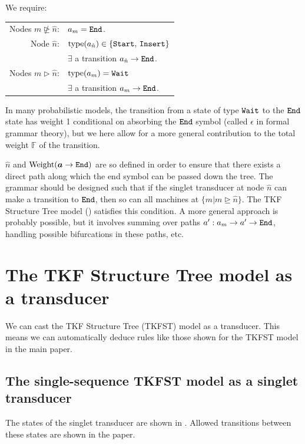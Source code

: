 \documentclass[10pt]{article}
\begin{document}
We require:

\begin{tabular}{rl}
  Nodes $m \ntrianglerighteq \hat{n}$: & $a_m = \mathtt{End}$. \\
  Node $\hat{n}$: & $\operatorname{type}(a_{\hat{n}}) \in \{\mathtt{Start},\,\mathtt{Insert}\}$ \\
  & $\exists$ a transition $a_{\hat{n}} \to \mathtt{End}$.  \\
  Nodes $m \vartriangleright \hat{n}$: & $\operatorname{type}(a_m) = \mathtt{Wait}$ \\
  & $\exists$ a transition $a_m \to \mathtt{End}$. \\
\end{tabular}

In many probabilistic models, the transition from a state of type $\mathtt{Wait}$ to the $\mathtt{End}$ state has weight 1 conditional on absorbing 
the $\mathtt{End}$ symbol (called $\epsilon$ in formal grammar theory),
but we here allow for a more general contribution to the total weight $\mathbb{F}$ of the transition.

$\hat{n}$ and $\operatorname{Weight}(\boldsymbol{a}\to\mathtt{End})$ are so defined in order to ensure that there exists a direct path
along which the end symbol can be passed down the tree.
The grammar should be designed such that if the singlet transducer at node $\hat{n}$ can make a transition to $\mathtt{End}$,
then so can all machines at $\{m|m \trianglerighteq \hat{n}\}$.
The TKF Structure Tree model () satisfies this condition.
A more general approach is probably possible, but it involves summing over paths $a': a_m \to a' \to \mathtt{End}$,
handling possible bifurcations in these paths, etc.



\newpage
\section{The TKF Structure Tree model as a transducer} 

We can cast the TKF Structure Tree (TKFST) model as a transducer.
This means we can automatically deduce rules like those shown for the TKFST model in the main paper.

\subsection{The single-sequence TKFST model as a singlet transducer}

The states of the singlet transducer are shown in .
Allowed transitions between these states are shown in the paper.
\end{document}
